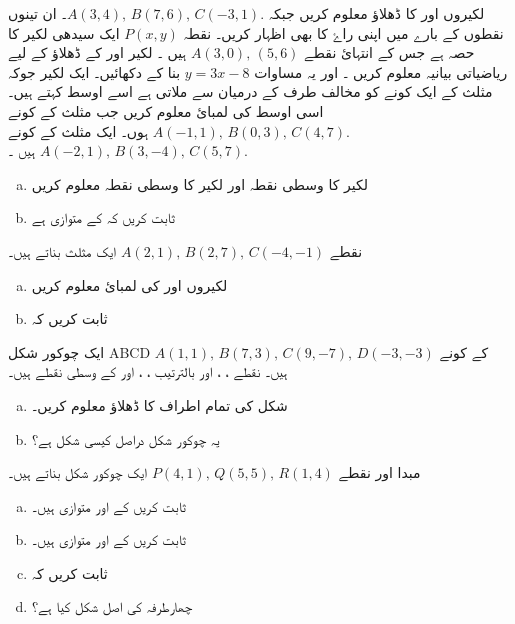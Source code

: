 لکیروں    اور    کا ڈھلاؤ معلوم کریں جبکہ  \( A (3,4), \, B (7,6), \, C (-3,1). \)۔ ان تینوں نقطوں کے بارے میں اپنی راۓ کا بھی اظہار کریں۔
نقطہ  \( P(x,y) \) ایک سیدھی لکیر کا حصہ ہے جس کے انتہائ نقطے  \(A(3,0), \, (5,6) \) ہیں ۔ لکیر    اور     کے ڈھلاؤ کے لیے ریاضیاتی بیانیہ معلوم کریں ۔ اور یہ مساوات    \( y=3x-8 \) بنا کے دکھائیں۔
ایک لکیر جوکہ مثلث کے ایک کونے کو مخالف طرف کے درمیان سے ملاتی ہے اسے اوسط کہتے ہیں۔ اسی اوسط    کی لمبائ معلوم کریں جب مثلث کے کونے \( A(-1,1), \, B(0,3), \, C(4,7). \) ہوں۔
ایک مثلث  کے کونے \( A(-2,1), \, B(3,-4), \, C( 5,7). \) ہیں ۔
\begin{enumerate}[a.]
\item
لکیر  کا وسطی نقطہ   اور لکیر      کا وسطی نقطہ     معلوم کریں
\item
ثابت کریں کہ       کے      متوازی ہے 
\end{enumerate}
نقطے  \( A(2,1), \, B(2,7), \, C(-4,-1) \) ایک مثلث بناتے ہیں۔ 
\begin{multicols}{2}
\begin{enumerate}[a.]
\item
لکیروں     اور  کی لمبائ معلوم کریں 
\item
ثابت کریں کہ  
\end{enumerate}
\end{multicols}
ایک چوکور شکل ABCD  کے کونے \( A(1,1), \, B(7,3), \, C(9,-7), \, D(-3,-3) \) ہیں۔ نقطے   ،   ،     اور      بالترتیب   ، ،    اور  کے وسطی نقطے ہیں۔
\begin{multicols}{2}
\begin{enumerate}[a.]
\item
شکل  کی تمام اطراف کا ڈھلاؤ معلوم کریں۔ 
\item
 یہ چوکور شکل   دراصل کیسی شکل ہے؟
\end{enumerate}
\end{multicols}
مبدا  اور     نقطے \( P(4,1), \, Q(5,5), \, R(1,4) \) ایک چوکور شکل بناتے ہیں۔ 
\begin{multicols}{2}
\begin{enumerate}[a.]
\item
ثابت کریں کے       اور    متوازی ہیں۔
\item
ثابت کریں کے اور    متوازی ہیں۔
\item
ثابت کریں کہ 
\item
چھارطرفہ  کی اصل شکل کیا ہے؟
\end{enumerate}
\end{multicols}
